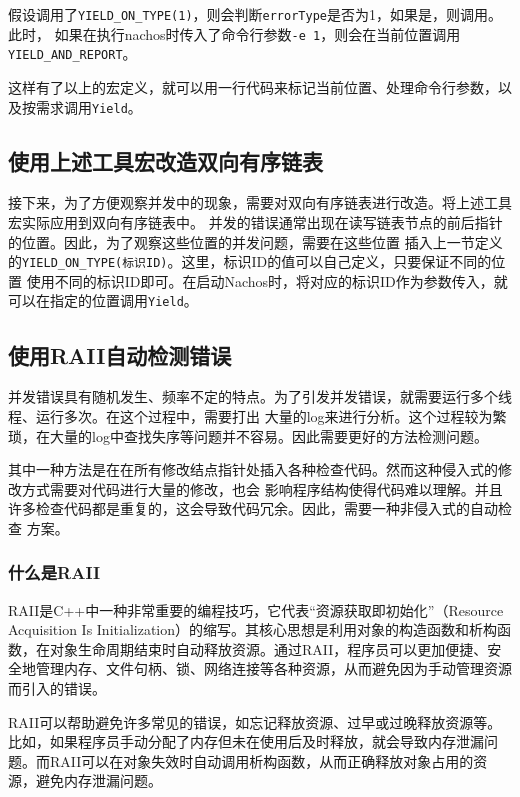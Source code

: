 \documentclass[a4paper,twoside]{article}
\begin{document}
\begin{spacing}{1.2}
假设调用了\texttt{YIELD\_ON\_TYPE(1)}，则会判断\texttt{errorType}是否为1，如果是，则调用。此时，
如果在执行nachos时传入了命令行参数\texttt{-e 1}，则会在当前位置调用\texttt{YIELD\_AND\_REPORT}。

这样有了以上的宏定义，就可以用一行代码来标记当前位置、处理命令行参数，以及按需求调用\texttt{Yield}。

\subsection{使用上述工具宏改造双向有序链表}

接下来，为了方便观察并发中的现象，需要对双向有序链表进行改造。将上述工具宏实际应用到双向有序链表中。
并发的错误通常出现在读写链表节点的前后指针的位置。因此，为了观察这些位置的并发问题，需要在这些位置
插入上一节定义的\texttt{YIELD\_ON\_TYPE(标识ID)}。这里，标识ID的值可以自己定义，只要保证不同的位置
使用不同的标识ID即可。在启动Nachos时，将对应的标识ID作为参数传入，就可以在指定的位置调用\texttt{Yield}。

\subsection{使用RAII自动检测错误}

并发错误具有随机发生、频率不定的特点。为了引发并发错误，就需要运行多个线程、运行多次。在这个过程中，需要打出
大量的log来进行分析。这个过程较为繁琐，在大量的log中查找失序等问题并不容易。因此需要更好的方法检测问题。

其中一种方法是在在所有修改结点指针处插入各种检查代码。然而这种侵入式的修改方式需要对代码进行大量的修改，也会
影响程序结构使得代码难以理解。并且许多检查代码都是重复的，这会导致代码冗余。因此，需要一种非侵入式的自动检查
方案。

\subsubsection{什么是RAII}

RAII是C++中一种非常重要的编程技巧，它代表“资源获取即初始化”（Resource Acquisition Is Initialization）的缩写。其核心思想是利用对象的构造函数和析构函数，在对象生命周期结束时自动释放资源。通过RAII，程序员可以更加便捷、安全地管理内存、文件句柄、锁、网络连接等各种资源，从而避免因为手动管理资源而引入的错误。

RAII可以帮助避免许多常见的错误，如忘记释放资源、过早或过晚释放资源等。比如，如果程序员手动分配了内存但未在使用后及时释放，就会导致内存泄漏问题。而RAII可以在对象失效时自动调用析构函数，从而正确释放对象占用的资源，避免内存泄漏问题。


\end{spacing}
\end{document}
